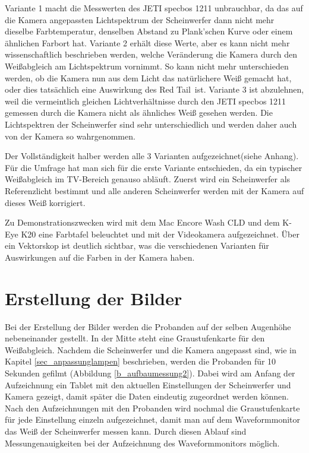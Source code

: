 \noindent Variante 1 macht die Messwerten des JETI specbos 1211 unbrauchbar, da das auf die Kamera angepassten Lichtspektrum der Scheinwerfer dann nicht mehr dieselbe Farbtemperatur, denselben Abstand zu Plank'schen Kurve oder einem ähnlichen Farbort hat. Variante 2 erhält diese Werte, aber es kann nicht mehr wissenschaftlich beschrieben werden, welche Veränderung die Kamera durch den Weißabgleich am Lichtspektrum vornimmt. So kann nicht mehr unterschieden werden, ob die Kamera nun aus dem Licht das natürlichere Weiß gemacht hat, oder dies tatsächlich eine Auswirkung des \glqq Red Tail\grqq\ ist.
Variante 3 ist abzulehnen, weil die vermeintlich gleichen Lichtverhältnisse durch den JETI specbos 1211 gemessen durch die Kamera nicht als ähnliches Weiß gesehen werden. Die Lichtspektren der Scheinwerfer sind sehr unterschiedlich und werden daher auch von der Kamera so wahrgenommen.

\noindent Der Vollständigkeit halber werden alle 3 Varianten aufgezeichnet(siehe Anhang). Für die Umfrage hat man sich für die erste Variante entschieden, da ein typischer Weißabgleich im TV-Bereich genauso abläuft. Zuerst wird ein Scheinwerfer als Referenzlicht bestimmt und alle anderen Scheinwerfer werden mit der Kamera auf dieses Weiß korrigiert. 

\noindent Zu Demonstrationszwecken wird mit dem Mac Encore Wash CLD und dem K-Eye K20 eine Farbtafel beleuchtet und mit der Videokamera aufgezeichnet. Über ein Vektorskop ist deutlich sichtbar, was die verschiedenen Varianten für Auswirkungen auf die Farben in der Kamera haben. 

\newpage
\section{Erstellung der Bilder}
\label{sec_erstellungbilder}
Bei der Erstellung der Bilder werden die Probanden auf der selben Augenhöhe nebeneinander gestellt. In der Mitte steht eine Graustufenkarte für den Weißabgleich. Nachdem die Scheinwerfer und die Kamera angepasst sind, wie in Kapitel \ref{sec_anpassunglampen} beschrieben, werden die Probanden für 10 Sekunden gefilmt (Abbildung \ref{b_aufbaumessung2}). Dabei wird am Anfang der Aufzeichnung ein Tablet mit den aktuellen Einstellungen der Scheinwerfer und Kamera gezeigt, damit später die Daten eindeutig zugeordnet werden können.\\
Nach den Aufzeichnungen mit den Probanden wird nochmal die Graustufenkarte für jede Einstellung einzeln aufgezeichnet, damit man auf dem Waveformmonitor das Weiß der Scheinwerfer messen kann. Durch diesen Ablauf sind Messungenauigkeiten bei der Aufzeichnung des Waveformmonitors möglich. 

